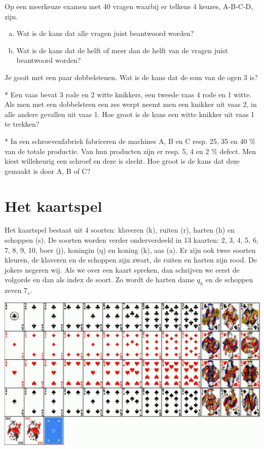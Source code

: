 \documentclass[12pt,twoside]{article}
\begin{document}
\begin{oefening}
Op een meerkeuze examen met 40 vragen waarbij er telkens 4 keuzes, A-B-C-D, zijn.
\begin{enumerate}[(a)]
  \item Wat is de kans dat alle vragen juist beantwoord worden?
  \item Wat is de kans dat de helft of meer dan de helft van de vragen juist beantwoord worden?
\end{enumerate}
\end{oefening}

\begin{oefening}
Je gooit met een paar dobbelstenen. Wat is de kans dat de som van de ogen 3 is?
\end{oefening}

\begin{oefening}*
Een vaas bevat 3 rode en 2 witte knikkers, een tweede vaas 4 rode en 1 witte. Als men met een dobbelsteen een zes werpt neemt men een knikker uit vaas 2, in alle andere gevallen uit vaas 1. Hoe groot is de kans een witte knikker uit vaas 1 te trekken?
\end{oefening}

\begin{oefening}*
In een schroevenfabriek fabriceren de machines A, B en C resp. 25, 35 en 40 \% van de totale productie. Van hun producten zijn er resp. 5, 4 en 2 \% defect. Men kiest willekeurig een schroef en deze is slecht. Hoe groot is de kans dat deze gemaakt
is door A, B of C?
\end{oefening}

\appendix
\cleardoublepage
\section{Het kaartspel}
Het kaartspel bestaat uit 4 soorten: klaveren (k), ruiten (r), harten (h) en schoppen (s). De soorten worden verder onderverdeeld in 13 kaarten: 2, 3, 4, 5, 6, 7, 8, 9, 10, boer (j), koningin (q) en koning (k), aas (a). Er zijn ook twee soorten kleuren, de klaveren en de schoppen zijn zwart, de ruiten en harten zijn rood. De jokers negeren wij. Als we over een kaart spreken, dan schrijven we eerst de volgorde en dan als index de soort. Zo wordt de harten dame $q_h$ en de schoppen zeven $7_s$.

\includegraphics[width=\textwidth, angle=0]{kaartspel}
\end{document}
